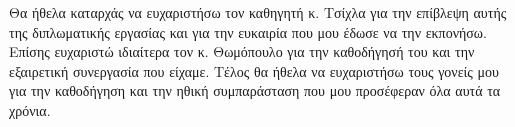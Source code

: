 \begin{acknowledgements}
Θα ήθελα καταρχάς να ευχαριστήσω τον καθηγητή κ. Τσίχλα
για την επίβλεψη αυτής της διπλωματικής εργασίας και για την
ευκαιρία που μου έδωσε να την εκπονήσω. Επίσης ευχαριστώ ιδιαίτερα
τον κ. Θωμόπουλο για την καθοδήγησή του και την εξαιρετική
συνεργασία που είχαμε. Τέλος θα ήθελα να ευχαριστήσω τους γονείς
μου για την καθοδήγηση και την ηθική συμπαράσταση που μου
προσέφεραν όλα αυτά τα χρόνια.
\end{acknowledgements}